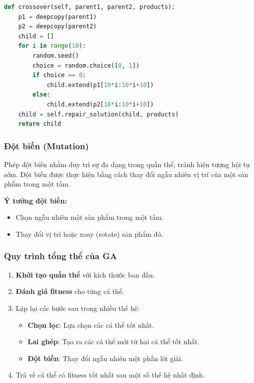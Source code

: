 \documentclass[a4paper]{article}
\begin{document}
\begin{lstlisting}[language=Python]
def crossover(self, parent1, parent2, products):
    p1 = deepcopy(parent1)
    p2 = deepcopy(parent2)
    child = []
    for i in range(10):
        random.seed()
        choice = random.choice([0, 1])
        if choice == 0:
            child.extend(p1[10*i:10*i+10])
        else:
            child.extend(p2[10*i:10*i+10])
    child = self.repair_solution(child, products)
    return child
\end{lstlisting}

\subsubsection{Đột biến (Mutation)}
\hspace{11pt}
Phép đột biến nhằm duy trì sự đa dạng trong quần thể, tránh hiện tượng hội tụ sớm. Đột biến được thực hiện bằng cách thay đổi ngẫu nhiên vị trí của một sản phẩm trong một tấm.

\textbf{Ý tưởng đột biến:}
\begin{itemize}
    \item Chọn ngẫu nhiên một sản phẩm trong một tấm.
    \item Thay đổi vị trí hoặc xoay (rotate) sản phẩm đó.
\end{itemize}

\subsubsection{Quy trình tổng thể của GA}
\begin{enumerate}
    \item \textbf{Khởi tạo quần thể} với kích thước ban đầu.
    \item \textbf{Đánh giá fitness} cho từng cá thể.
    \item Lặp lại các bước sau trong nhiều thế hệ:
    \begin{itemize}
        \item \textbf{Chọn lọc}: Lựa chọn các cá thể tốt nhất.
        \item \textbf{Lai ghép}: Tạo ra các cá thể mới từ hai cá thể tốt nhất.
        \item \textbf{Đột biến}: Thay đổi ngẫu nhiên một phần lời giải.
    \end{itemize}
    \item Trả về cá thể có fitness tốt nhất sau một số thế hệ nhất định.
\end{enumerate}
\end{document}
